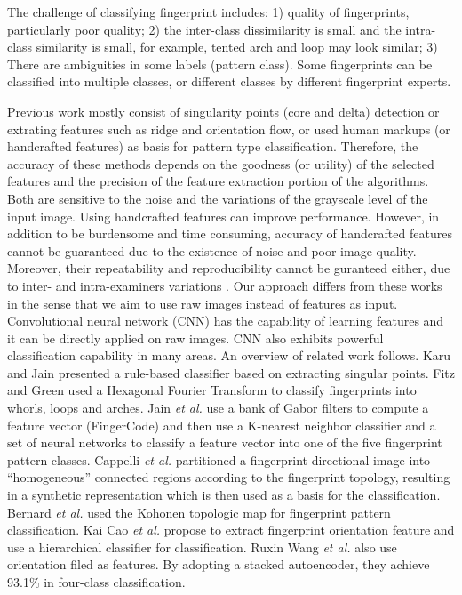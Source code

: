 
The challenge of classifying fingerprint includes: 
%
1) quality of fingerprints, particularly poor quality; 
%
2) the inter-class dissimilarity is small and the intra-class similarity is small, for example, tented arch and loop may look similar; 
%
3) There are ambiguities in some labels (pattern class). Some fingerprints can be classified into multiple classes, or different classes by different fingerprint experts.

Previous work mostly consist of singularity points (core and delta) detection or extrating features such as ridge and orientation flow, or used human markups (or handcrafted features) as basis for pattern type classification. Therefore, the accuracy of these methods depends on the goodness (or utility) of the selected features and the precision of the feature extraction portion of the algorithms. Both are sensitive to the noise and the variations of the grayscale level of the input image.  Using handcrafted features can improve performance.  However, in addition to be burdensome and time consuming, accuracy of handcrafted features cannot be guaranteed due to the existence of noise and poor image quality. Moreover, their repeatability and reproducibility cannot be guranteed either, due to inter- and intra-examiners variations \cite{fbiBlackbox}.  
%
Our approach differs from these works in the sense that we aim to use raw images instead of features as input. Convolutional neural network (CNN) has the capability of learning features and it can be directly applied on raw images. CNN also exhibits powerful classification capability in many areas\cite{lecun2015deep}\cite{szegedy2016rethinking}.
%
An overview of related work follows. 
%
Karu and Jain \cite{karuJain1996} presented a rule-based classifier based on extracting singular points. 
%
Fitz and Green \cite{FitzGreen1996} used a Hexagonal Fourier Transform to classify fingerprints into whorls, loops and arches. 
%
Jain \textit{et al.} \cite{JainSalil1999} use a bank of Gabor filters to compute a feature vector (FingerCode) and then use a K-nearest neighbor classifier and a set of neural networks to classify a feature vector into one of the five fingerprint pattern classes.
%
Cappelli \textit{et al.} \cite{cappelli1999} partitioned a fingerprint directional image into ``homogeneous'' connected regions according to the fingerprint topology, resulting in a synthetic representation which is then used as a basis for the classification.
%
 Bernard \textit{et al.} \cite{Bernard2001} used the Kohonen topologic map for fingerprint pattern classification. 
%
Kai Cao \textit{et al.}\cite{cao2013fingerprint} propose to extract fingerprint orientation feature and use a hierarchical classifier for classification.
%
Ruxin Wang \textit{et al.} \cite{wang2014fingerprint} also use orientation filed as features. By adopting a stacked autoencoder, they achieve 93.1\% in four-class classification.
 
